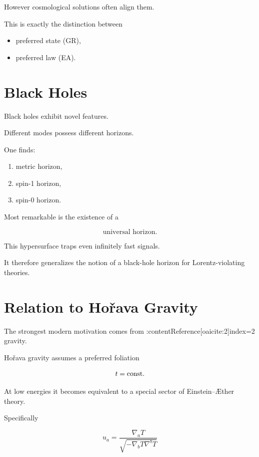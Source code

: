 \documentclass[11pt,a4paper]{article}
\begin{document}
However cosmological solutions often align them.

This is exactly the distinction between

\begin{itemize}
\item preferred state (GR),
\item preferred law (EA).
\end{itemize}

\section{Black Holes}

Black holes exhibit novel features.

Different modes possess different horizons.

One finds:

\begin{enumerate}
\item metric horizon,
\item spin-1 horizon,
\item spin-0 horizon.
\end{enumerate}

Most remarkable is the existence of a

\begin{equation}
\text{universal horizon}.
\end{equation}

This hypersurface traps even infinitely fast signals.

It therefore generalizes the notion of a black-hole horizon
for Lorentz-violating theories.

\section{Relation to Ho\v rava Gravity}

The strongest modern motivation comes from
:contentReference[oaicite:2]{index=2}
gravity.

Ho\v rava gravity assumes a preferred foliation

\begin{equation}
t={\rm const}.
\end{equation}

At low energies it becomes equivalent to a special sector of
Einstein--\AE ther theory.

Specifically

\begin{equation}
u_a
=
\frac{\nabla_a T}
{\sqrt{-\nabla_bT\nabla^bT}}
\end{equation}
\end{document}
